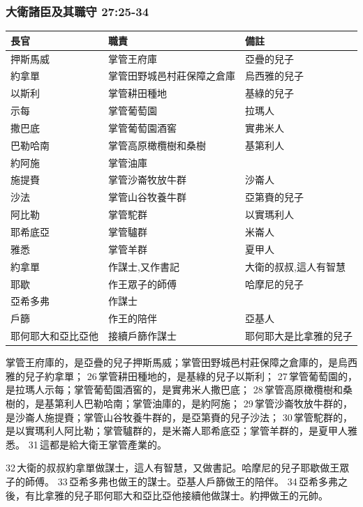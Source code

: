 \subsubsection{大衛諸臣及其職守 27:25-34}
\begin{table}[H]
\centering
\begin{tabular}{p{3.5cm}|p{5.3cm}|p{4.3cm}}\hline\hline
長官                    & 職責  & 備註  \\\hline
押斯馬威  &掌管王府庫    &亞疊的兒子\\\hline
約拿單  &掌管田野城邑村莊保障之倉庫           &烏西雅的兒子 \\\hline
以斯利  &掌管耕田種地& 基綠的兒子 \\\hline
示每  &掌管葡萄園& 拉瑪人\\\hline
撒巴底  &掌管葡萄園酒窖&實弗米人\\\hline
巴勒哈南  &掌管高原橄欖樹和桑樹  &基第利人  \\\hline
 約阿施 &掌管油庫 &\\\hline
 施提賚& 掌管沙崙牧放牛群 &沙崙人\\\hline
 沙法 &掌管山谷牧養牛群 &亞第賚的兒子\\\hline
 阿比勒&掌管駝群&以實瑪利人\\\hline
 耶希底亞&掌管驢群& 米崙人\\\hline
 雅悉  &掌管羊群& 夏甲人 \\\hline
 約拿單&作謀士,又作書記& 大衛的叔叔,這人有智慧\\\hline
 耶歇&作王眾子的師傅&哈摩尼的兒子\\\hline
 亞希多弗&作謀士&\\\hline
 戶篩&作王的陪伴&亞基人\\\hline
耶何耶大和亞比亞他&接續戶篩作謀士&耶何耶大是比拿雅的兒子\\\hline
\end{tabular}
\end{table}	 
掌管王府庫的，是亞疊的兒子押斯馬威；掌管田野城邑村莊保障之倉庫的，是烏西雅的兒子約拿單； 26 掌管耕田種地的，是基綠的兒子以斯利； 27 掌管葡萄園的，是拉瑪人示每；掌管葡萄園酒窖的，是實弗米人撒巴底； 28 掌管高原橄欖樹和桑樹的，是基第利人巴勒哈南；掌管油庫的，是約阿施； 29 掌管沙崙牧放牛群的，是沙崙人施提賚；掌管山谷牧養牛群的，是亞第賚的兒子沙法； 30 掌管駝群的，是以實瑪利人阿比勒；掌管驢群的，是米崙人耶希底亞；掌管羊群的，是夏甲人雅悉。 31 這都是給大衛王掌管產業的。

32 大衛的叔叔約拿單做謀士，這人有智慧，又做書記。哈摩尼的兒子耶歇做王眾子的師傅。 33 亞希多弗也做王的謀士。亞基人戶篩做王的陪伴。 34 亞希多弗之後，有比拿雅的兒子耶何耶大和亞比亞他接續他做謀士。約押做王的元帥。


